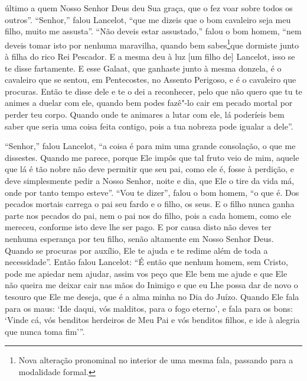 último a quem Nosso Senhor Deus deu Sua graça, que o fez voar sobre todos os
outros”. “Senhor,” falou Lancelot, “que me dizeis que o bom
cavaleiro seja meu filho, muito me assusta”. “Não deveis estar assustado,”
falou o bom homem, “nem deveis tomar isto por nenhuma maravilha, quando bem
sabes\footnote{ Nova alteração pronominal no interior de uma mesma fala,
passando para a modalidade formal. }que dormiste junto à filha do
rico Rei Pescador. E a mesma deu à luz [um filho de] Lancelot, isso se te disse fartamente.
E esse Galaat, que ganhaste junto à mesma donzela, é o cavaleiro que se sentou,
em Pentecostes, no Assento Perigoso, e é o cavaleiro que procuras. Então te
disse dele e te o dei a reconhecer, pelo que não quero que tu te animes a
duelar com ele, quando bem podes fazê"-lo cair em pecado mortal por perder teu
corpo. Quando onde te animares a lutar com ele, lá poderíeis bem saber que
seria uma coisa feita contigo, pois a tua nobreza pode igualar a dele”.

 “Senhor,” falou Lancelot, “a coisa é para mim uma grande consolação, o que me
dissestes. Quando me parece, porque Ele impôs que tal fruto veio de mim, aquele
que lá é tão nobre não deve permitir que seu pai, como ele é, fosse à perdição,
e deve simplesmente pedir a Nosso Senhor, noite e dia, que Ele o tire da vida
má, onde por tanto tempo esteve”. “Vou te dizer”, falou o bom homem, “o que é.
Dos pecados mortais carrega o pai seu fardo e o filho, os seus. E o filho nunca
ganha parte nos pecados do pai, nem o pai nos do filho, pois a cada homem, como
ele mereceu, conforme isto deve lhe ser pago. E por causa disto não deves ter
nenhuma esperança por teu filho, senão altamente em Nosso Senhor Deus. Quando
se procuras por auxílio, Ele te ajuda e te redime além de toda a necessidade”.
Então falou Lancelot: “É então que nenhum homem, sem Cristo, pode me apiedar
nem ajudar, assim vos peço que Ele bem me ajude e que Ele não queira me deixar
cair nas mãos do Inimigo e que eu Lhe possa dar de novo o tesouro que Ele me
deseja, que é a alma minha no Dia do Juízo. Quando Ele fala para os maus: ‘Ide
daqui, vós malditos, para o fogo eterno’, e fala para os bons: ‘Vinde cá, vós
benditos herdeiros de Meu Pai e vós benditos filhos, e ide à alegria que nunca
toma fim’”. 


